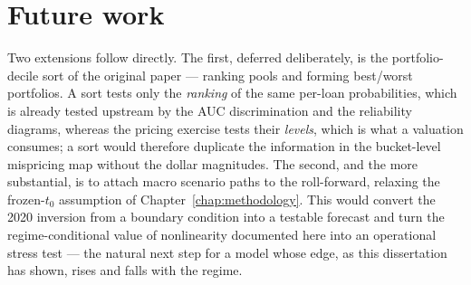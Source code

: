 \section{Future work}
\label{sec:concl-future}

Two extensions follow directly. The first, deferred deliberately, is
the portfolio-decile sort of the original paper --- ranking pools and
forming best/worst portfolios. A sort tests only the \emph{ranking} of
the same per-loan probabilities, which is already tested upstream by the
AUC discrimination and the reliability diagrams, whereas the pricing
exercise tests their \emph{levels}, which is what a valuation consumes;
a sort would therefore duplicate the information in the bucket-level
mispricing map without the dollar magnitudes. The second, and the more
substantial, is to attach macro scenario paths to the roll-forward,
relaxing the frozen-$t_0$ assumption of Chapter~\ref{chap:methodology}.
This would convert the 2020 inversion from a boundary condition into a
testable forecast and turn the regime-conditional value of nonlinearity
documented here into an operational stress test --- the natural next
step for a model whose edge, as this dissertation has shown, rises and
falls with the regime.
